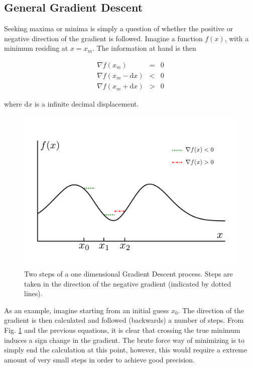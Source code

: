 \subsection{General Gradient Descent}

Seeking maxima or minima is simply a question of whether the positive or negative direction of the gradient is followed.
Imagine a function $f(x)$, with a minimum residing at $x=x_m$. The information at hand is then

\begin{eqnarray}
 \nabla f(x_m) &=& 0 \\
 \nabla f(x_m - \mathrm{d}x) &<& 0 \\
  \nabla f(x_m + \mathrm{d}x) &>& 0
\end{eqnarray}

where $\mathrm{d}x$ is a infinite decimal displacement. 

\begin{figure}
 \begin{center}
  \includegraphics[scale=0.3]{../Graphics/SGD.pdf}
  \caption{Two steps of a one dimensional Gradient Descent process. Steps are taken in the direction of the negative gradient (indicated by dotted lines).}
  \label{fig:SGD}
 \end{center}
\end{figure}

As an example, imagine starting from an initial guess $x_0$. The direction of the gradient is then calculated and followed (backwards) a number of steps. From Fig. \ref{fig:SGD} and the previous equations, it is clear that crossing the true minimum induces a sign change in the gradient. The brute force way of minimizing is to simply end the calculation at this point, however, this would require a extreme amount of very small steps in order to achieve good precision. 

